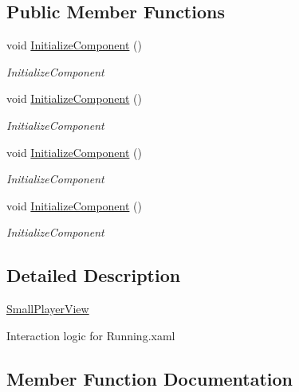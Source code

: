 \subsection*{Public Member Functions}
\begin{DoxyCompactItemize}
\item 
void \hyperlink{class_presentation_1_1_view_1_1_small_player_view_a1199bc28ab3753d6689a2aaa87142c09}{Initialize\+Component} ()
\begin{DoxyCompactList}\small\item\em Initialize\+Component \end{DoxyCompactList}\item 
void \hyperlink{class_presentation_1_1_view_1_1_small_player_view_a1199bc28ab3753d6689a2aaa87142c09}{Initialize\+Component} ()
\begin{DoxyCompactList}\small\item\em Initialize\+Component \end{DoxyCompactList}\item 
void \hyperlink{class_presentation_1_1_view_1_1_small_player_view_a1199bc28ab3753d6689a2aaa87142c09}{Initialize\+Component} ()
\begin{DoxyCompactList}\small\item\em Initialize\+Component \end{DoxyCompactList}\item 
void \hyperlink{class_presentation_1_1_view_1_1_small_player_view_a1199bc28ab3753d6689a2aaa87142c09}{Initialize\+Component} ()
\begin{DoxyCompactList}\small\item\em Initialize\+Component \end{DoxyCompactList}\end{DoxyCompactItemize}


\subsection{Detailed Description}
\hyperlink{class_presentation_1_1_view_1_1_small_player_view}{Small\+Player\+View} 

Interaction logic for Running.\+xaml 

\subsection{Member Function Documentation}
\mbox{\label{class_presentation_1_1_view_1_1_small_player_view_a1199bc28ab3753d6689a2aaa87142c09}} 
